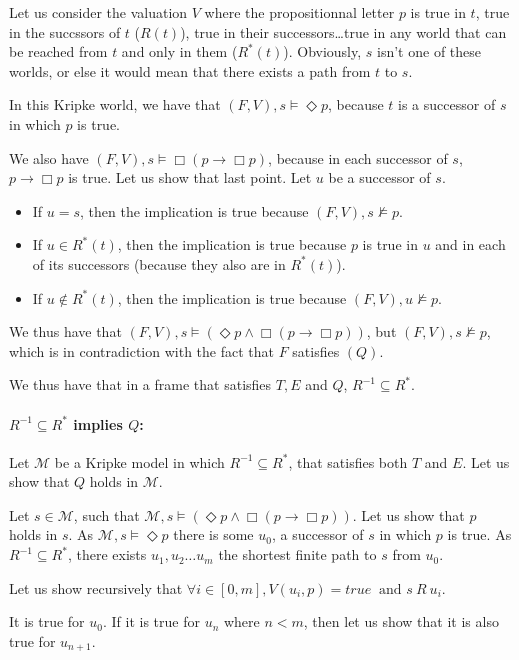 \documentclass[10pt]{article}
\def\M{\mathcal{M}}
\begin{document}
Let us consider the valuation $V$ where the propositionnal letter $p$ is true in $t$, true in the succssors of $t$ ($R(t)$), true in their successors\dots true in any world that can be reached from $t$ and only in them ($R^*(t)$). Obviously, $s$ isn't one of these worlds, or else it would mean that there exists a path from $t$ to $s$.


In this Kripke world, we have that $(F,V),s\models\Diamond p$, because $t$ is a successor of $s$ in which $p$ is true. 

We also have $(F,V),s\models\Box(p\rightarrow\Box p)$, because in each successor of $s$, $p\rightarrow\Box p$ is true. Let us show that last point. Let $u$ be a successor of $s$.

\begin{itemize}
\item If $u=s$, then the implication is true because $(F,V),s\not\models p$.
\item If $u\in R^*(t)$, then the implication is true because $p$ is true in $u$ and in each of its successors (because they also are in $R^*(t)$).
\item If $u\not\in R^*(t)$, then the implication is true because $(F,V),u\not\models p$.
\end{itemize}

We thus have that $(F,V),s\models (\Diamond p\wedge\Box(p\rightarrow\Box p))$, but $(F,V),s\not\models p$, which is in contradiction with the fact that $F$ satisfies $(Q)$.

We thus have that in a frame that satisfies $T,E$ and $Q$, $R^{-1}\subseteq R^*$.


\paragraph{$R^{-1}\subseteq R^*$ implies $Q$:}
Let $\M$ be a Kripke model in which $R^{-1}\subseteq R^*$, that satisfies both $T$ and $E$. Let us show that $Q$ holds in $\M$.

Let $s\in\M$, such that $\M,s\models(\Diamond p\wedge\Box(p\rightarrow\Box p))$. Let us show that $p$ holds in $s$. As $\M,s\models\Diamond p$ there is some $u_0$, a successor of $s$ in which $p$ is true. As $R^{-1}\subseteq R^*$, there exists $u_1,u_2\dots u_m$ the shortest finite path to $s$ from $u_0$.

Let us show recursively that $\forall i\in[0,m], V(u_i,p)=\mathit{true\ } \text{ and\ } s\ R\ u_i$.

It is true for $u_0$.
If it is true for $u_n$ where $n<m$, then let us show that it is also true for $u_{n+1}$.
\end{document}
